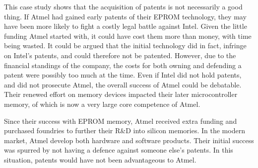 This case study shows that the acquisition of patents is not necessarily a good thing.
If Atmel had gained early patents of their EPROM technology, they may have been more likely to fight a costly legal battle against Intel.
Given the little funding Atmel started with, it could have cost them more than money, with time being wasted. 
It could be argued that the initial technology did in fact, infringe on Intel's patents, and could therefore not be patented.
However, due to the financial standings of the company, the costs for both owning and defending a patent were possibly too much at the time.
Even if Intel did not hold patents, and did not prosecute Atmel, the overall success of Atmel could be debatable. 
Their renewed effort on memory devices impacted their later microcontroller memory, of which is now a very large core competence of Atmel.

Since their success with EPROM memory, Atmel received extra funding \citeneeded and purchased foundries to further their R\&D into silicon memories. 
In the modern market, Atmel develop both hardware and software products. 
Their initial success was spurred by not having a defence against someone else's patents. 
In this situation, patents would have not been advantageous to Atmel.

